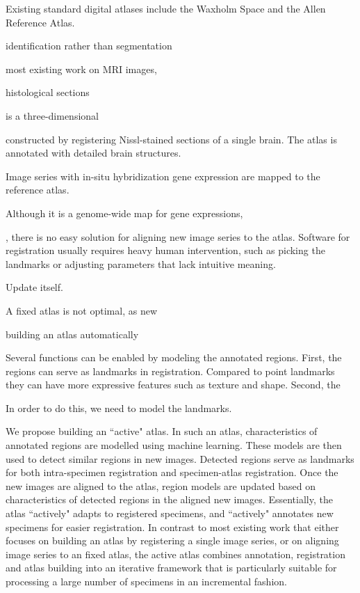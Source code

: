 \documentclass{llncs}
\begin{document}

Existing standard digital atlases include the Waxholm Space and the Allen Reference Atlas.

identification rather than segmentation

most existing work on MRI images, 

histological sections


is a three-dimensional 

 constructed by registering Nissl-stained sections of a single brain. The atlas is annotated with detailed brain structures.

 Image series with in-situ hybridization gene expression are mapped to the reference atlas.


Although it is a genome-wide map for gene expressions, 

, there is no easy solution for aligning new image series to the atlas. Software for registration usually requires heavy human intervention, such as picking the landmarks or adjusting parameters that lack intuitive meaning.


Update itself. 


A fixed atlas is not optimal, as new 

building an atlas automatically 

Several functions can be enabled by modeling the annotated regions. First, the regions can serve as landmarks in registration. Compared to point landmarks they can have more expressive features such as texture and shape. Second, the 


In order to do this, we need to model the landmarks. 

We propose building an ``active" atlas. In such an atlas, characteristics of annotated regions are modelled using machine learning. These models are then used to detect similar regions in new images. Detected regions serve as landmarks for both intra-specimen registration and specimen-atlas registration. Once the new images are aligned to the atlas, region models are updated based on characteristics of detected regions in the aligned new images. Essentially, the atlas ``actively" adapts to registered specimens, and ``actively" annotates new specimens for easier registration. In contrast to most existing work that either focuses on building an atlas by registering a single image series, or on aligning image series to an fixed atlas, the active atlas combines annotation, registration and atlas building into an iterative framework that is particularly suitable for processing a large number of specimens in an incremental fashion.
\end{document}
